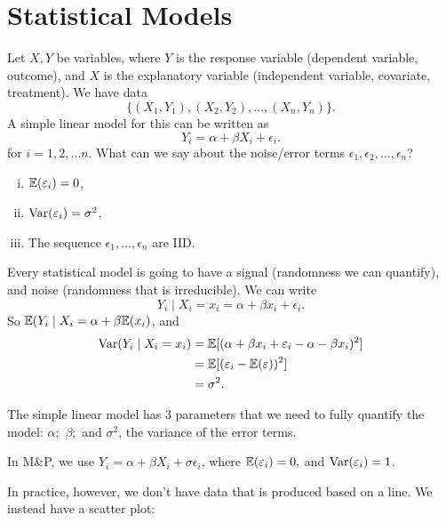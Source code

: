 \setcounter{chapter}{5}
\chapter{Statistical Models}

	Let $X,Y$ be variables, where $Y$ is the response variable (dependent variable, outcome), and $X$ is the explanatory variable (independent variable, covariate, treatment). We have data
	\[
		\{(X_1,Y_1),(X_2,Y_2),\ldots,(X_n,Y_n)\}
	.\] 
	A simple linear model for this can be written as \[
	Y_i=\alpha+\beta X_i +\epsilon_i
	.\] for $i=1,2,\ldots n.$  What can we say about the noise/error terms $\epsilon_1,\epsilon_2,\ldots,\epsilon_n$? 

	\begin{enumerate}[(i)]
		\item $\mathbb E(\varepsilon_i)=0$,
		\item $\operatorname*{Var}(\varepsilon_i)=\sigma^2$,
		\item The sequence $\epsilon_1,\ldots,\epsilon_n$ are IID.
	\end{enumerate}

Every statistical model is going to have a signal (randomness we can quantify), and noise (randomness that is irreducible). We can write
\[
Y_i\mid X_i = x_i = \alpha +\beta x_i+\epsilon_i
.\] 
So $\mathbb E(Y_i\mid X_i=\alpha+\beta\mathbb E(x_i)$, and
 \begin{align*}
		 \operatorname*{Var}(Y_i\mid X_i=x_i)&=\mathbb E[(\alpha+\beta x_i +\varepsilon_i-\alpha -\beta x_i)^2]\\
				     &=\mathbb E[(\varepsilon_i-\mathbb E(\varepsilon))^2] \\
					 &=\sigma^2
.\end{align*} 

The simple linear model has 3 parameters that we need to fully quantify the model: $\alpha;$ $\beta;$ and $ \sigma^2$, the variance of the error terms. 

\begin{remark}
	In M\&P, we use $Y_i=\alpha+\beta X_i+\sigma\epsilon_i$, where $\mathbb E(\varepsilon_i)=0,$ and $\operatorname*{Var}(\varepsilon_i)=1$.
\end{remark}


In practice, however, we don't have data that is produced based on a line. We instead have a scatter plot:

